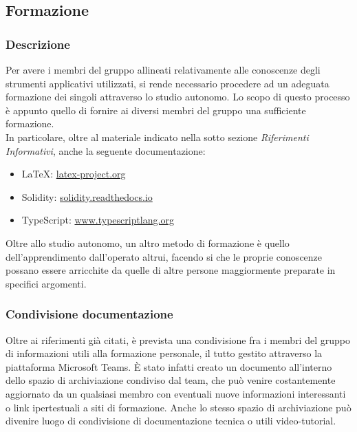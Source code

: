 \subsection{Formazione}
		\subsubsection{Descrizione}	
		Per avere i membri del gruppo \Gruppo{} allineati relativamente alle conoscenze degli strumenti applicativi utilizzati, si rende necessario procedere ad un adeguata formazione dei singoli attraverso lo studio autonomo. Lo scopo di questo processo è appunto quello di fornire ai diversi membri del gruppo una sufficiente formazione.\\
		In particolare, oltre al materiale indicato nella sotto sezione \textit{Riferimenti Informativi}, anche la seguente documentazione:
		\begin{itemize}
			\item \LaTeX{}: \href{latex-project.org}{latex-project.org}
			\item Solidity: \href{solidity.readthedocs.io}{solidity.readthedocs.io}
			\item TypeScript: \href{www.typescriptlang.org}{www.typescriptlang.org}
		\end{itemize}
		Oltre allo studio autonomo, un altro metodo di formazione è quello dell'apprendimento dall'operato altrui, facendo si che le proprie conoscenze possano essere arricchite da quelle di altre persone maggiormente preparate in specifici argomenti.
		
		\subsubsection{Condivisione documentazione}
		Oltre ai riferimenti già citati, è prevista una condivisione fra i membri del gruppo di informazioni utili alla formazione personale, il tutto gestito attraverso la piattaforma Microsoft Teams. È stato infatti creato un documento all'interno dello spazio di archiviazione condiviso dal team, che può venire costantemente aggiornato da un qualsiasi membro con eventuali nuove informazioni interessanti o link ipertestuali a siti di formazione. Anche lo stesso spazio di archiviazione può divenire luogo di condivisione di documentazione tecnica o utili video-tutorial.
